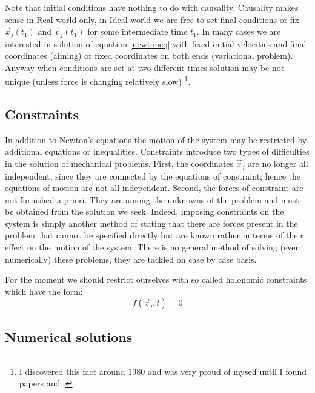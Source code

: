Note that initial conditions have nothing to do with causality. Causality makes
sense in Real world only, in Ideal world we are free to set final conditions or
fix $\vec x_j(t_1)$ and $\vec v_j(t_1)$ for some intermediate time $t_1$. In
many cases we are interested in solution of equation \eqref{newtoneq} with
fixed initial velocities and final coordinates  (aiming) or fixed coordinates
on both ends (variational problem). Anyway when conditions are set at two
different times  solution may be not unique (unless force is changing
relatively slow) \footnote {I discovered this fact around 1980 and was very
proud of myself until I found papers \cite{Maslov-1} and \cite{Maslov-2}.}.

\subsection{Constraints} 

In addition to Newton's equations the motion of the system may be restricted by
additional equations or inequalities. Constraints introduce two types of
difficulties in the solution of mechanical problems. First, the coordinates
$\vec x_j$ are no longer all independent, since they are connected by the
equations of constraint; hence the equations of motion  are not all
independent. Second, the forces of constraint  are not furnished a priori. They
are among the unknowns of the problem and must be obtained from the solution we
seek. Indeed, imposing constraints on the system  is simply another method of
stating that there are forces present in the problem that cannot be specified
directly but are known rather in terms of their effect on the motion of the
system. There is no general method of solving (even numerically) these
problems, they are tackled on case by case basis.

For the moment we should restrict ourselves with so called holonomic
constraints which have the form:
\begin{equation}
        f(\vec x_j,t)=0 \label {hol-const}
\end{equation}

\subsection{Numerical solutions}

